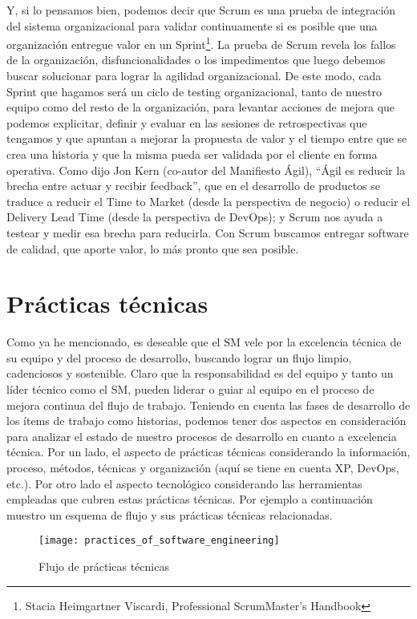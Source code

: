 Y, si lo pensamos bien, podemos decir que Scrum es una prueba de integración del sistema organizacional para validar continuamente si es posible que una organización entregue valor en un Sprint\footnote{Stacia Heimgartner Viscardi, Professional ScrumMaster's Handbook}. La prueba de Scrum revela los fallos de la organización, disfuncionalidades o los impedimentos que luego debemos buscar solucionar para lograr la agilidad organizacional. De este modo, cada Sprint que hagamos será un ciclo de testing organizacional, tanto de nuestro equipo como del resto de la organización, para levantar acciones de mejora que podemos explicitar, definir y evaluar en las sesiones de retrospectivas que tengamos y que apuntan a mejorar la propuesta de valor y el tiempo entre que se crea una historia y que la misma pueda ser validada por el cliente en forma operativa. Como dijo Jon Kern (co-autor del Manifiesto Ágil), “Ágil es reducir la brecha entre actuar y recibir feedback”, que en el desarrollo de productos se traduce a reducir el Time to Market (desde la perspectiva de negocio) o reducir el Delivery Lead Time (desde la perspectiva de DevOps); y Scrum nos ayuda a testear y medir esa brecha para reducirla. Con Scrum buscamos entregar software de calidad, que aporte valor, lo más pronto que sea posible.

\section{Prácticas técnicas}

Como ya he mencionado, es deseable que el SM vele por la excelencia técnica de su equipo y del proceso de desarrollo, buscando lograr un flujo limpio, cadenciosos y sostenible. Claro que la responsabilidad es del equipo y tanto un líder técnico como el SM, pueden liderar o guiar al equipo en el proceso de mejora continua del flujo de trabajo. Teniendo en cuenta las fases de desarrollo de los ítems de trabajo como historias, podemos tener dos aspectos en consideración para analizar el estado de nuestro procesos de desarrollo en cuanto a excelencia técnica. Por un lado, el aspecto de prácticas técnicas considerando la información, proceso, métodos, técnicas y organización (aquí se tiene en cuenta XP, DevOps, etc.). Por otro lado el aspecto tecnológico considerando las herramientas empleadas que cubren estas prácticas técnicas. Por ejemplo a continuación muestro un esquema de flujo y sus prácticas técnicas relacionadas.

\begin{figure}[h]
  \centering
  \texttt{[image: practices\_of\_software\_engineering]}
  \caption{Flujo de prácticas técnicas}
  \centering
  \label{fig:practices_of_software_engineering} %
\end{figure}
\FloatBarrier %

